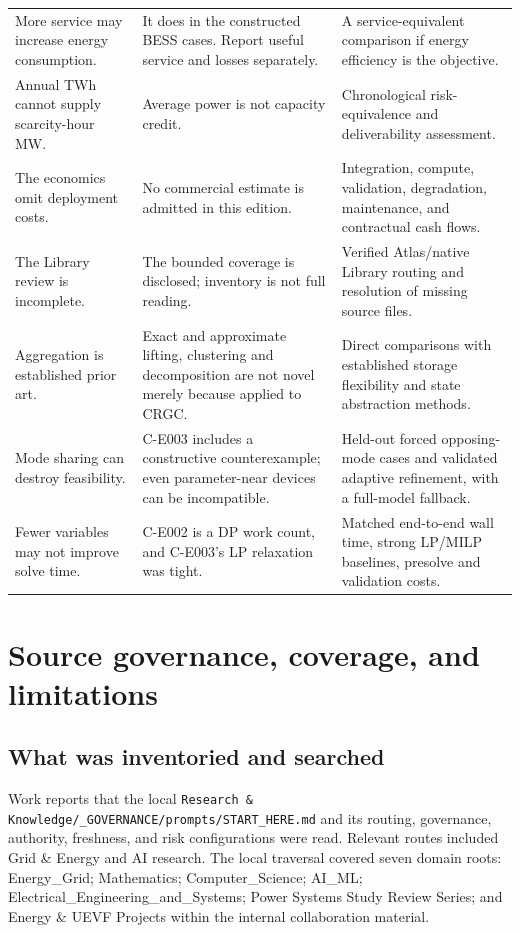 \documentclass[11pt,letterpaper]{article}
\begin{document}
\begin{longtable}{P{.27\linewidth}P{.38\linewidth}P{.26\linewidth}}
More service may increase energy consumption. & It does in the constructed BESS cases. Report useful service and losses separately. & A service-equivalent comparison if energy efficiency is the objective.\\
Annual TWh cannot supply scarcity-hour MW. & Average power is not capacity credit. & Chronological risk-equivalence and deliverability assessment.\\
The economics omit deployment costs. & No commercial estimate is admitted in this edition. & Integration, compute, validation, degradation, maintenance, and contractual cash flows.\\
The Library review is incomplete. & The bounded coverage is disclosed; inventory is not full reading. & Verified Atlas/native Library routing and resolution of missing source files.\\
Aggregation is established prior art. & Exact and approximate lifting, clustering and decomposition are not novel merely because applied to CRGC. & Direct comparisons with established storage flexibility and state abstraction methods.\\
Mode sharing can destroy feasibility. & C-E003 includes a constructive counterexample; even parameter-near devices can be incompatible. & Held-out forced opposing-mode cases and validated adaptive refinement, with a full-model fallback.\\
Fewer variables may not improve solve time. & C-E002 is a DP work count, and C-E003's LP relaxation was tight. & Matched end-to-end wall time, strong LP/MILP baselines, presolve and validation costs.\\
\bottomrule
\end{longtable}

\section{Source governance, coverage, and limitations}
\label{sec:sources}
\subsection{What was inventoried and searched}
Work reports that the local \texttt{Research \& Knowledge/\_GOVERNANCE/prompts/START\_HERE.md} and its routing, governance, authority, freshness, and risk configurations were read. Relevant routes included Grid \& Energy and AI research. The local traversal covered seven domain roots: Energy\_Grid; Mathematics; Computer\_Science; AI\_ML; Electrical\_Engineering\_and\_Systems; Power Systems Study Review Series; and Energy \& UEVF Projects within the internal collaboration material.
\end{document}

